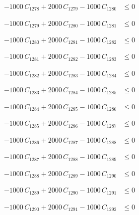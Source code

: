 \documentclass[a4paper,11pt]{article}
\begin{document}
\begin{align}
-1000\,C_{1278} + 2000\,C_{1279} - 1000\,C_{1280} &\leq 0 \nonumber
\end{align}

\begin{align}
-1000\,C_{1279} + 2000\,C_{1280} - 1000\,C_{1281} &\leq 0 \nonumber
\end{align}

\begin{align}
-1000\,C_{1280} + 2000\,C_{1281} - 1000\,C_{1282} &\leq 0 \nonumber
\end{align}

\begin{align}
-1000\,C_{1281} + 2000\,C_{1282} - 1000\,C_{1283} &\leq 0 \nonumber
\end{align}

\begin{align}
-1000\,C_{1282} + 2000\,C_{1283} - 1000\,C_{1284} &\leq 0 \nonumber
\end{align}

\begin{align}
-1000\,C_{1283} + 2000\,C_{1284} - 1000\,C_{1285} &\leq 0 \nonumber
\end{align}

\begin{align}
-1000\,C_{1284} + 2000\,C_{1285} - 1000\,C_{1286} &\leq 0 \nonumber
\end{align}

\begin{align}
-1000\,C_{1285} + 2000\,C_{1286} - 1000\,C_{1287} &\leq 0 \nonumber
\end{align}

\begin{align}
-1000\,C_{1286} + 2000\,C_{1287} - 1000\,C_{1288} &\leq 0 \nonumber
\end{align}

\begin{align}
-1000\,C_{1287} + 2000\,C_{1288} - 1000\,C_{1289} &\leq 0 \nonumber
\end{align}

\begin{align}
-1000\,C_{1288} + 2000\,C_{1289} - 1000\,C_{1290} &\leq 0 \nonumber
\end{align}

\begin{align}
-1000\,C_{1289} + 2000\,C_{1290} - 1000\,C_{1291} &\leq 0 \nonumber
\end{align}

\begin{align}
-1000\,C_{1290} + 2000\,C_{1291} - 1000\,C_{1292} &\leq 0 \nonumber
\end{align}
\end{document}
